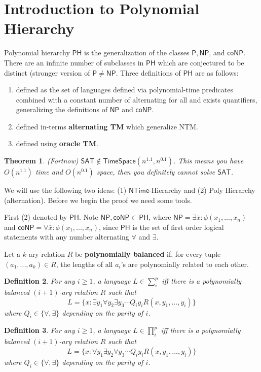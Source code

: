 \documentclass[twoside]{article}
\newcounter{lecnum}
\newtheorem{theorem}{Theorem}[lecnum]
\newtheorem{definition}[theorem]{Definition}
\def\P{\mathsf{P}}
\def\NP{\mathsf{NP}}
\def\coNP{\mathsf{coNP}}
\def\PH{\mathsf{PH}}
\def\SAT{\mathsf{SAT}}
\def\NTime{\mathsf{NTime}}
\begin{document}
\section{Introduction to Polynomial Hierarchy}

Polynomial hierarchy $\PH$ is the generalization of the classes $\P, \NP$, and $\coNP$. There are an infinite number of subclasses in $\PH$ which are conjectured to be distinct (stronger version of $\P \neq \NP$. Three definitions of $\PH$ are as follows:
\begin{enumerate}
\item defined as the set of languages defined via polynomial-time predicates combined with a constant number of alternating for all and exists quantifiers, generalizing the definitions of $\NP$ and $\coNP$. 
\item defined in-terms \textbf{alternating TM} which generalize NTM.
\item defined using \textbf{oracle TM}.
\end{enumerate}

\begin{theorem}
(Fortnow) $\SAT \notin \mathsf{TimeSpace} (n^{1.1}, n^{0.1})$. This means you have $O(n^{1.1})$ time and $O(n^{0.1})$ space, then you definitely cannot solve $\SAT$.
\end{theorem}

We will use the following two ideas: (1) $\NTime$-Hierarchy and (2) Poly Hierarchy (alternation). Before we begin the proof we need some tools. 

First (2) denoted by $\PH$. Note $\NP, \coNP \subset \PH$, where $\NP = \exists \bar{x}: \phi(x_1, ..., x_n)$ and $\coNP = \forall \bar{x}: \phi (x_1, ..., x_n)$, since $\PH$ is the set of first order logical statements with any number alternating $\forall$ and $\exists$. 

Let a $k$-ary relation $R$ be \textbf{polynomially balanced} if, for every tuple $(a_1, ..., a_k) \in R$, the lengths of all $a_i$'s are polynomially related to each other.

\begin{definition}
For any $i\geq 1$, a language $L \in \sum_{i}^{p}$ iff there is a polynomially balanced $(i+1)$-ary relation $R$ such that 
\[L = \{x: \exists y_1\forall y_2 \exists y_3 \cdots Q_iy_iR(x, y_1, ..., y_i)\}\]
where $Q_i \in \{\forall, \exists\}$ depending on the parity of $i$. 
\end{definition}

\begin{definition}
For any $i\geq 1$, a language $L \in \prod_{i}^{p}$ iff there is a polynomially balanced $(i+1)$-ary relation $R$ such that 
\[L = \{x: \forall y_1\exists y_2 \forall y_3 \cdots Q_iy_iR(x, y_1, ..., y_i)\}\]
where $Q_i \in \{\forall, \exists\}$ depending on the parity of $i$. 
\end{definition}
\end{document}
